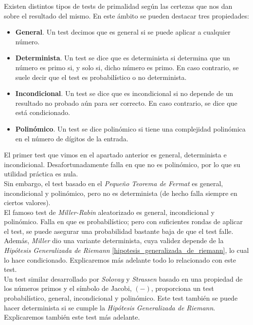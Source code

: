 Existen distintos tipos de tests de primalidad según las certezas que nos dan sobre el resultado del mismo. En este ámbito se pueden destacar tres propiedades:

\begin{itemize}
	\item \textbf{General}. Un test decimos que es general si se puede aplicar a cualquier número.
	
	\item \textbf{Determinista}. Un test se dice que es determinista si determina que un número es primo si, y solo si, dicho número es primo. En caso contrario, se suele decir que el test es probabilístico o no determinista.
	
	\item \textbf{Incondicional}. Un test se dice que es incondicional si no depende de un resultado no probado aún para ser correcto. En caso contrario, se dice que está condicionado.
	
	\item \textbf{Polinómico}. Un test se dice polinómico si tiene una complejidad polinómica en el número de dígitos de la entrada.
\end{itemize}

El primer test que vimos en el apartado anterior es general, determinista e incondicional. Desafortunadamente falla en que no es polinómico, por lo que su utilidad práctica es nula.\\

Sin embargo, el test basado en el \textit{Pequeño Teorema de Fermat} es general, incondicional y polinómico, pero no es determinista (de hecho falla siempre en ciertos valores).\\

El famoso test de \textit{Miller-Rabin} aleatorizado es general, incondicional y polinómico. Falla en que es probabilístico; pero con suficientes rondas de aplicar el test, se puede asegurar una probabilidad bastante baja de que el test falle. Además, \textit{Miller} dio una variante determinista, cuya validez depende de la \textit{Hipótesis Generalizada de Riemann} \ref{hipotesis_generalizada_de_riemann}, lo cual lo hace condicionado. Explicaremos más adelante todo lo relacionado con este test.\\

Un test similar desarrollado por \textit{Solovay} y \textit{Strassen} basado en una propiedad de los números primos y el símbolo de Jacobi, $(-)$, proporciona un test probabilístico, general, incondicional y polinómico. Este test también se puede hacer determinista si se cumple la \textit{Hipótesis Generalizada de Riemann}. Explicaremos también este test más adelante.\\

